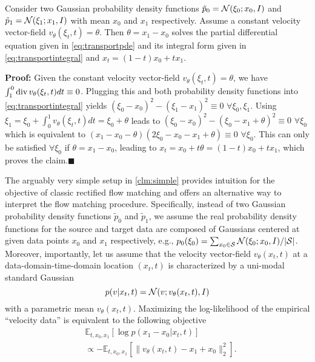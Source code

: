 \begin{claim}
Consider two Gaussian probability density functions $\tilde{p}_0 = {\cal N}(\xi_0; x_0,I)$ and $\tilde{p}_1 = {\cal N}(\xi_1; x_1,I)$ with mean $x_0$ and $x_1$ respectively. %
Assume 
a constant velocity vector-field $v_\theta(\xi_t,t)=\theta$. Then $\theta = x_1 - x_0$ solves the partial differential equation given in \cref{eq:transportpde} and its integral form given in \cref{eq:transportintegral} and $x_t = (1-t)x_0 + tx_1$.
\label{clm:simple}
\end{claim}
\textbf{Proof:} Given the constant velocity vector-field $v_\theta(\xi_t,t) = \theta$, we have $\int_1^0 \operatorname{div} v_\theta(\xi_t,t)dt \equiv 0$.  Plugging this and both probability density functions into \cref{eq:transportintegral} yields $(\xi_0 - x_0)^2 -(\xi_1 - x_1)^2\equiv 0$ $\forall \xi_0, \xi_1$. Using $\xi_1 = \xi_0 + \int_0^1 v_\theta(\xi_t,t)dt = \xi_0 + \theta$ leads to $(\xi_0-x_0)^2 - (\xi_0 - x_1+\theta)^2 \equiv 0$ $\forall \xi_0$ which is equivalent to $(x_1-x_0-\theta)(2\xi_0-x_0-x_1+\theta)\equiv 0$ $\forall \xi_0$. This can only be satisfied $\forall \xi_0$ if $\theta = x_1-x_0$, leading to $x_t = x_0 + t\theta = (1-t)x_0+tx_1$, which proves the claim.\hfill$\blacksquare$


The arguably very simple setup in \cref{clm:simple} provides intuition for the objective of classic rectified flow matching and offers an alternative way to interpret the flow matching procedure. %
Specifically, instead of two Gaussian probability density functions $\tilde{p}_0$ and $\tilde{p}_1$, we assume the real probability density functions for the source and target data are composed of  Gaussians centered at given data points $x_0$ and $x_1$ respectively, e.g., $p_0(\xi_0) = \sum_{x_0\in{\cal S}} {\cal N}(\xi_0; x_0,I)/|{\cal S}|$. Moreover, importantly, let us assume that the velocity vector-field $v_\theta(x_t,t)$ at a data-domain-time-domain location $(x_t,t)$ is characterized by a uni-modal standard Gaussian
$$
p(v|x_t,t) = {\cal N}(v; v_\theta(x_t,t),I)
$$
with a parametric mean $v_\theta(x_t,t)$. Maximizing the log-likelihood of the empirical ``velocity data''
 is equivalent to the following objective
\begin{equation}
\begin{split}
&\mathbb{E}_{t,x_0,x_1}\left[\log p(x_1-x_0|x_t,t)\right] \\
&\propto -\mathbb{E}_{t,x_0,x_1}\left[\|v_\theta(x_t,t) - x_1 + x_0\|_2^2\right].
\end{split}
\label{eq:rf}
\end{equation}

